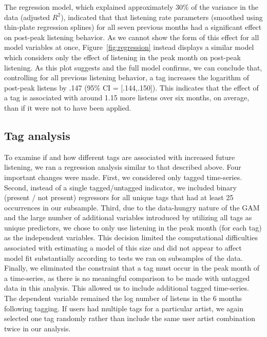 The regression model, which explained approximately 30\% of the variance in the data (adjusted $R^{2}$), indicated that that listening rate parameters (smoothed using thin-plate regression splines) for all seven previous months had a significant effect on post-peak listening behavior. As we cannot show the form of this effect for all model variables at once, Figure~\ref{fig:regression} instead displays a similar model which considers only the effect of listening in the peak month on post-peak listening. As this plot suggests and the full model confirms, we can conclude that, controlling for all previous listening behavior, a tag increases the logarithm of post-peak listens by .147 (95\% CI = [.144,.150]). This indicates that the effect of a tag is associated with around 1.15 more listens over six months, on average, than if it were not to have been applied.   

\subsection{Tag analysis}
To examine if and how different tags are associated with increased future listening, we ran a regression analysis similar to that described above. Four important changes were made. First, we considered only tagged time-series.  Second, instead of a single tagged/untagged indicator, we included binary (present / not present) regressors for all unique tags that had at least 25 occurrences in our subsample. Third, due to the data-hungry nature of the GAM and the large number of additional variables introduced by utilizing all tags as unique predictors, we chose to only use listening in the peak month (for each tag) as the independent variables. This decision limited the computational difficulties associated with estimating a model of this size and did not appear to affect model fit substantially according to tests we ran on subsamples of the data. Finally, we eliminated the constraint that a tag must occur in the peak month of a time-series, as there is no meaningful comparison to be made with untagged data in this analysis. This allowed us to include additional tagged time-series. The dependent variable remained the log number of listens in the 6 months following tagging. If users had multiple tags for a particular artist, we again selected one tag randomly rather than include the same user artist combination twice in our analysis.

